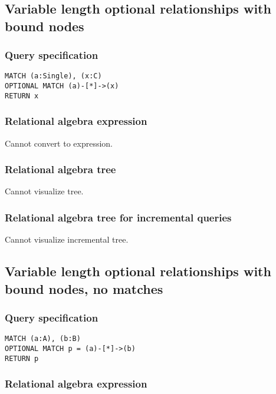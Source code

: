 \subsection{Variable length optional relationships with bound nodes}

\subsubsection*{Query specification}

\begin{lstlisting}
MATCH (a:Single), (x:C)
OPTIONAL MATCH (a)-[*]->(x)
RETURN x
\end{lstlisting}

\subsubsection*{Relational algebra expression}

Cannot convert to expression.

\subsubsection*{Relational algebra tree}

Cannot visualize tree.

\subsubsection*{Relational algebra tree for incremental queries}

Cannot visualize incremental tree.

\subsection{Variable length optional relationships with bound nodes, no matches}

\subsubsection*{Query specification}

\begin{lstlisting}
MATCH (a:A), (b:B)
OPTIONAL MATCH p = (a)-[*]->(b)
RETURN p
\end{lstlisting}

\subsubsection*{Relational algebra expression}


